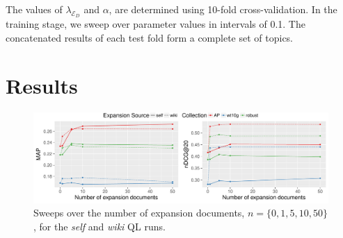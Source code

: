 \documentclass{sig-alternate}
\begin{document}
The values of $\lambda_{\mathcal{E}_D}$ and $\alpha$, are determined using 10-fold cross-validation. In the training stage, we sweep over parameter values in intervals of 0.1. The concatenated results of each test fold form a complete set of topics.

\section{Results}\label{section.results}

\begin{figure}
\centering
\includegraphics[width=\linewidth]{figures/expansion-sweep.pdf}
\caption{Sweeps over the number of expansion documents, $n = \{0, 1, 5, 10, 50\}$, for the \textit{self} and \textit{wiki} QL runs.}
\label{figure.n-sweeps}
\end{figure}
\end{document}
